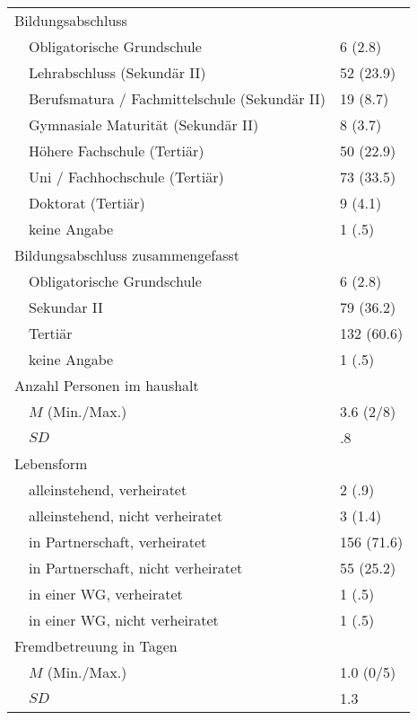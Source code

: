 \begin{longtable}[l]{m{0.5em}  m{20em}  m{5em}}
  \multicolumn{2}{l}{Bildungsabschluss} \\
  & Obligatorische Grundschule & 6 (2.8)\\
  & Lehrabschluss (Sekundär II)& 52 (23.9)\\
  & Berufsmatura / Fachmittelschule (Sekundär II) & 19 (8.7)\\
  & Gymnasiale Maturität (Sekundär II) & 8 (3.7)\\
  & Höhere Fachschule (Tertiär) & 50 (22.9)\\
  & Uni / Fachhochschule (Tertiär) & 73 (33.5)\\
  & Doktorat (Tertiär) & 9 (4.1)\\
  & keine Angabe & 1 (.5)\\
  
  \multicolumn{2}{l}{Bildungsabschluss zusammengefasst} \\
  & Obligatorische Grundschule & 6 (2.8)\\
  & Sekundar II & 79 (36.2)\\
  & Tertiär & 132 (60.6)\\
  & keine Angabe & 1 (.5)\\
  
  \multicolumn{2}{l}{Anzahl Personen im haushalt} \\
  &  $M$ (Min./Max.) & 3.6 (2/8)\\
  & $SD$ &  .8\\
  
  \multicolumn{2}{l}{Lebensform} \\
  & alleinstehend, verheiratet & 2 (.9)\\
  & alleinstehend, nicht verheiratet & 3 (1.4)\\
  & in Partnerschaft, verheiratet & 156 (71.6)\\
  & in Partnerschaft, nicht verheiratet & 55 (25.2)\\
  & in einer WG, verheiratet & 1 (.5)\\
  & in einer WG, nicht verheiratet & 1 (.5)\\
  
  \multicolumn{2}{l}{Fremdbetreuung in Tagen} \\
  &  $M$ (Min./Max.) & 1.0 (0/5)\\
  & $SD$ &  1.3\\
\end{longtable}
